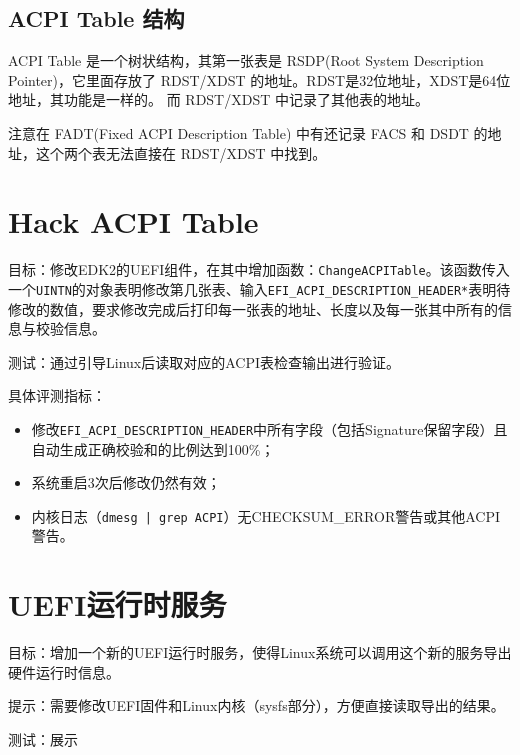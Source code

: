 \subsection{ACPI Table 结构}

ACPI Table 是一个树状结构，其第一张表是 RSDP(Root System Description Pointer)，它里面存放了 RDST/XDST 的地址。RDST是32位地址，XDST是64位地址，其功能是一样的。
而 RDST/XDST 中记录了其他表的地址。

注意在 FADT(Fixed ACPI Description Table) 中有还记录 FACS 和 DSDT 的地址，这个两个表无法直接在 RDST/XDST 中找到。

\section{Hack ACPI Table}
目标：修改EDK2的UEFI组件，在其中增加函数：\texttt{ChangeACPITable}。该函数传入一个\texttt{UINTN}的对象表明修改第几张表、输入\texttt{EFI\_ACPI\_DESCRIPTION\_HEADER*}表明待修改的数值，要求修改完成后打印每一张表的地址、长度以及每一张其中所有的信息与校验信息。

测试：通过引导Linux后读取对应的ACPI表检查输出进行验证。

具体评测指标：
\begin{itemize}
\item 修改\texttt{EFI\_ACPI\_DESCRIPTION\_HEADER}中所有字段（包括Signature保留字段）且自动生成正确校验和的比例达到100\%；
\item 系统重启3次后修改仍然有效；
\item 内核日志（\texttt{dmesg | grep ACPI}）无CHECKSUM\_ERROR警告或其他ACPI警告。
\end{itemize}

\section{UEFI运行时服务}
目标：增加一个新的UEFI运行时服务，使得Linux系统可以调用这个新的服务导出硬件运行时信息。

提示：需要修改UEFI固件和Linux内核（sysfs部分），方便直接读取导出的结果。

测试：展示
